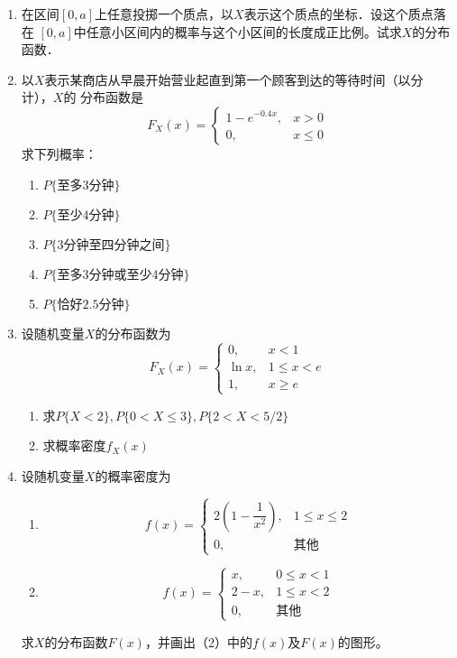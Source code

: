 \documentclass[10pt,a4paper]{article}
\begin{document}
\begin{enumerate}
    \item 在区间$[0,a]$上任意投掷一个质点，以$X$表示这个质点的坐标．设这个质点落在
    $[0,a]$中任意小区间内的概率与这个小区间的长度成正比例。试求$X$的分布函数．


    \item 以$X$表示某商店从早晨开始营业起直到第一个顾客到达的等待时间（以分计），$X$的
    分布函数是
    $$F_X(x)=\left\{\begin{array}{ll}
        1-e^{-0.4x}, & x>0\\
        0, & x\leq 0
    \end{array}\right.$$
    求下列概率：
    \begin{enumerate}
        \item $P\{\mbox{至多3分钟}\}$
        \item $P\{\mbox{至少4分钟}\}$
        \item $P\{\mbox{3分钟至四分钟之间}\}$
        \item $P\{\mbox{至多3分钟或至少4分钟}\}$
        \item $P\{\mbox{恰好2.5分钟}\}$
    \end{enumerate}


    \item 设随机变量$X$的分布函数为
    $$F_X(x)=\left\{\begin{array}{ll}
        0, & x<1\\
        \ln x, & 1\leq x <e\\
        1, & x\geq e
    \end{array}\right.$$
    \begin{enumerate}
        \item 求$P\{X<2\},P\{0<X\leq 3\},P\{2<X<5/2\}$
        \item 求概率密度$f_X(x)$
    \end{enumerate}



    \item 设随机变量$X$的概率密度为
    \begin{enumerate}
        \item $$
            f(x)=\left\{\begin{array}{ll}
                2(1-\dfrac{1}{x^2}), & 1\leq x\leq 2\\
                0, & \mbox{其他} 
            \end{array}\right.
        $$
        \item $$
        f(x)=\left\{\begin{array}{ll}
            x, & 0\leq x <1\\
            2-x, & 1\leq x <2\\
            0, & \mbox{其他} 
        \end{array}\right.
        $$
    \end{enumerate}
    求$X$的分布函数$F(x)$，并画出（2）中的$f(x)$及$F(x)$的图形。


\end{enumerate}
\end{document}
